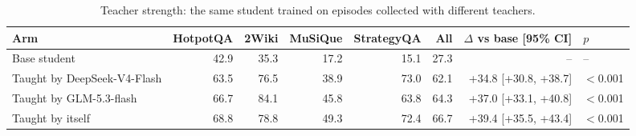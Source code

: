 \begin{table}[t]
\centering
\small
\caption{Teacher strength: the same student trained on episodes collected with different teachers.}
\label{tab:E06-teachers}
\begin{tabular}{lrrrrrrl}
\toprule
Arm & HotpotQA & 2Wiki & MuSiQue & StrategyQA & All & $\Delta$ vs base [95\% CI] & $p$ \\
\midrule
Base student & 42.9 & 35.3 & 17.2 & 15.1 & 27.3 & -- & -- \\
Taught by DeepSeek-V4-Flash & 63.5 & 76.5 & 38.9 & 73.0 & 62.1 & +34.8 [+30.8, +38.7] & $<$0.001 \\
Taught by GLM-5.3-flash & 66.7 & 84.1 & 45.8 & 63.8 & 64.3 & +37.0 [+33.1, +40.8] & $<$0.001 \\
Taught by itself & 68.8 & 78.8 & 49.3 & 72.4 & 66.7 & +39.4 [+35.5, +43.4] & $<$0.001 \\
\bottomrule
\end{tabular}
\end{table}
